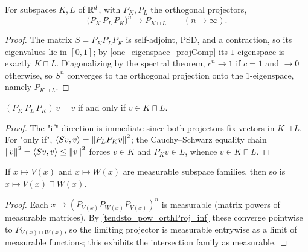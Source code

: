 \begin{proposition}\label{tendsto_pow_orthProj_inf}
  \leanok
  For subspaces \(K, L\) of \(\mathbb{R}^d\), with \(P_K, P_L\) the orthogonal projectors,
  \[
    \bigl(P_K\,P_L\,P_K\bigr)^{n} \longrightarrow P_{K \sqcap L} \qquad (n \to \infty).
  \]
\end{proposition}
\begin{proof}\leanok
  The matrix \(S = P_K P_L P_K\) is self-adjoint, PSD, and a contraction, so its eigenvalues lie in \([0,1]\); by \cref{one_eigenspace_projComp} its \(1\)-eigenspace is exactly \(K \sqcap L\). Diagonalizing by the spectral theorem, \(c^n \to 1\) if \(c = 1\) and \(\to 0\) otherwise, so \(S^n\) converges to the orthogonal projection onto the \(1\)-eigenspace, namely \(P_{K\sqcap L}\).
\end{proof}

\begin{lemma}\label{one_eigenspace_projComp}
  \leanok
  \((P_K\,P_L\,P_K)\,v = v\) if and only if \(v \in K \sqcap L\).
\end{lemma}
\begin{proof}\leanok
  The "if" direction is immediate since both projectors fix vectors in \(K \sqcap L\). For "only if", \(\langle Sv, v\rangle = \left\lVert P_L P_K v \right\rVert^2\); the Cauchy--Schwarz equality chain \(\left\lVert v \right\rVert^2 = \langle Sv, v\rangle \le \left\lVert v \right\rVert^2\) forces \(v \in K\) and \(P_K v \in L\), whence \(v \in K \sqcap L\).
\end{proof}

\begin{proposition}\label{inf}
  \leanok
  If \(x \mapsto V(x)\) and \(x \mapsto W(x)\) are measurable subspace families, then so is \(x \mapsto V(x) \sqcap W(x)\).
\end{proposition}
\begin{proof}\leanok
  Each \(x \mapsto (P_{V(x)} P_{W(x)} P_{V(x)})^{n}\) is measurable (matrix powers of measurable matrices). By \cref{tendsto_pow_orthProj_inf} these converge pointwise to \(P_{V(x)\sqcap W(x)}\), so the limiting projector is measurable entrywise as a limit of measurable functions; this exhibits the intersection family as measurable.
\end{proof}

